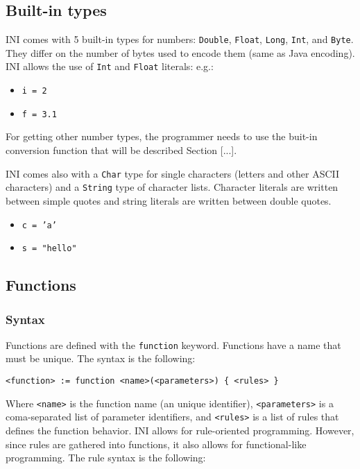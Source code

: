 \documentclass[11pt]{article}
\begin{document}
\subsection{Built-in types}

INI comes with 5 built-in types for numbers: \texttt{Double}, \texttt{Float}, \texttt{Long}, \texttt{Int}, and \texttt{Byte}. They differ on the number of bytes used to encode them (same as Java encoding). INI allows the use of \texttt{Int} and \texttt{Float} literals: e.g.:

\begin{itemize}
\item \texttt{i = 2}
\item \texttt{f = 3.1}
\end{itemize}

For getting other number types, the programmer needs to use the buit-in conversion function that will be described Section [...].

INI comes also with a \texttt{Char} type for single characters (letters and other ASCII characters) and a \texttt{String} type of character lists. Character literals are written between simple quotes and string literals are written between double quotes.

\begin{itemize}
\item \texttt{c = 'a'}
\item \texttt{s = "hello"}
\end{itemize}

\subsection{Functions}

\subsubsection{Syntax}

Functions are defined with the \texttt{function} keyword. Functions have a name that must be unique. The syntax is the following:

\begin{verbatim}
<function> := function <name>(<parameters>) { <rules> }
\end{verbatim}

Where \texttt{<name>} is the function name (an unique identifier), \texttt{<parameters>} is a coma-separated list of parameter identifiers, and \texttt{<rules>} is a list of rules that defines the function behavior. INI allows for rule-oriented programming. However, since rules are gathered into functions, it also allows for functional-like programming. The rule syntax is the following:
\end{document}
